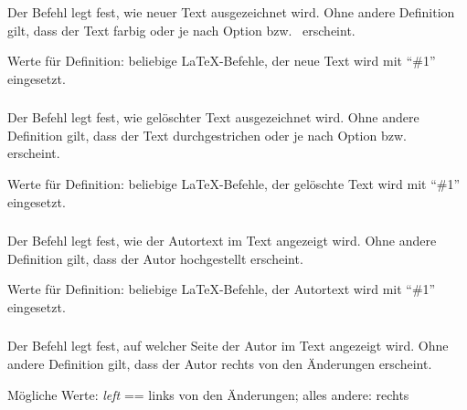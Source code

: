 Der Befehl  legt fest, wie neuer Text ausgezeichnet wird.
Ohne andere Definition gilt, dass der Text farbig oder je nach Option  bzw.\  erscheint.

Werte für Definition: beliebige \LaTeX-Befehle, der neue Text wird mit "`\#1"' eingesetzt.




\subsubsection{}
\DescribeMacro{\setdeletedmarkup}

Der Befehl  legt fest, wie gelöschter Text ausgezeichnet wird.
Ohne andere Definition gilt, dass der Text durchgestrichen oder je nach Option  bzw.\  erscheint.

Werte für Definition: beliebige \LaTeX-Befehle, der gelöschte Text wird mit "`\#1"' eingesetzt.




\subsubsection{}
\DescribeMacro{\setauthormarkup}

Der Befehl  legt fest, wie der Autortext im Text angezeigt wird.
Ohne andere Definition gilt, dass der Autor hochgestellt erscheint.

Werte für Definition: beliebige \LaTeX-Befehle, der Autortext wird mit "`\#1"' eingesetzt.




\subsubsection{}
\DescribeMacro{\setauthormarkupposition}

Der Befehl  legt fest, auf welcher Seite der Autor im Text angezeigt wird.
Ohne andere Definition gilt, dass der Autor rechts von den Änderungen erscheint.

Mögliche Werte: \emph{left} == links von den Änderungen; alles andere: rechts




